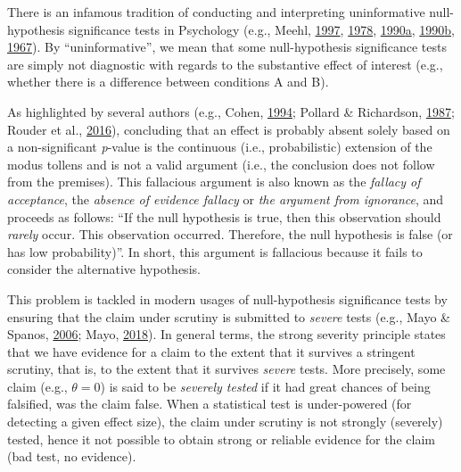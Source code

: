 \documentclass[
  english,
  man, donotrepeattitle,floatsintext]{apa6}
\begin{document}
There is an infamous tradition of conducting and interpreting uninformative null-hypothesis significance tests in Psychology (e.g., Meehl, \protect\hyperlink{ref-harlow_problem_1997}{1997}, \protect\hyperlink{ref-meehl_theoretical_1978}{1978}, \protect\hyperlink{ref-meehl_why_1990}{1990}\protect\hyperlink{ref-meehl_why_1990}{a}, \protect\hyperlink{ref-meehl_appraising_1990-1}{1990}\protect\hyperlink{ref-meehl_appraising_1990-1}{b}, \protect\hyperlink{ref-meehl_theory-testing_1967}{1967}). By ``uninformative'', we mean that some null-hypothesis significance tests are simply not diagnostic with regards to the substantive effect of interest (e.g., whether there is a difference between conditions A and B).

As highlighted by several authors (e.g., Cohen, \protect\hyperlink{ref-cohen_earth_1994}{1994}; Pollard \& Richardson, \protect\hyperlink{ref-pollard_probability_1987}{1987}; Rouder et al., \protect\hyperlink{ref-rouder_is_2016}{2016}), concluding that an effect is probably absent solely based on a non-significant \emph{p}-value is the continuous (i.e., probabilistic) extension of the modus tollens and is not a valid argument (i.e., the conclusion does not follow from the premises). This fallacious argument is also known as the \emph{fallacy of acceptance}, the \emph{absence of evidence fallacy} or \emph{the argument from ignorance}, and proceeds as follows: ``If the null hypothesis is true, then this observation should \emph{rarely} occur. This observation occurred. Therefore, the null hypothesis is false (or has low probability)''. In short, this argument is fallacious because it fails to consider the alternative hypothesis.

This problem is tackled in modern usages of null-hypothesis significance tests by ensuring that the claim under scrutiny is submitted to \emph{severe} tests (e.g., Mayo \& Spanos, \protect\hyperlink{ref-mayo_severe_2006}{2006}; Mayo, \protect\hyperlink{ref-mayo_statistical_2018}{2018}). In general terms, the strong severity principle states that we have evidence for a claim to the extent that it survives a stringent scrutiny, that is, to the extent that it survives \emph{severe} tests. More precisely, some claim (e.g., \(\theta = 0\)) is said to be \emph{severely tested} if it had great chances of being falsified, was the claim false. When a statistical test is under-powered (for detecting a given effect size), the claim under scrutiny is not strongly (severely) tested, hence it not possible to obtain strong or reliable evidence for the claim (bad test, no evidence).
\end{document}

